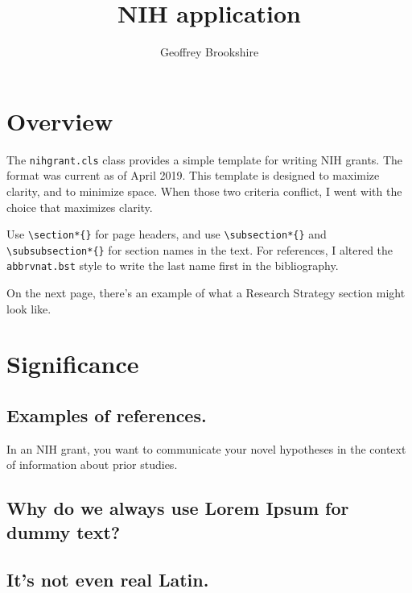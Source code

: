 \documentclass{nihgrant}
\title{NIH application}
\author{Geoffrey Brookshire}
\date{}
\begin{document}
\section*{Overview}

The \verb|nihgrant.cls| class provides a simple template for writing NIH grants. The format was current as of April 2019. This template is designed to maximize clarity, and to minimize space. When those two criteria conflict, I went with the choice that maximizes clarity.

Use \verb|\section*{}| for page headers, and use \verb|\subsection*{}| and \verb|\subsubsection*{}| for section names in the text. For references, I altered the \verb|abbrvnat.bst| style to write the last name first in the bibliography.

On the next page, there's an example of what a Research Strategy section might look like.

\pagebreak

\section*{Significance}

\subsection*{Examples of references.} In an NIH grant, you want to communicate your novel hypotheses \cite{kuhn1962} in the context of information \cite{shannon1948} about prior studies.

\subsection*{Why do we always use Lorem Ipsum for dummy text?}
\lipsum[1-1]

\subsection*{It's not even real Latin.} 
\lipsum[3-3]
\end{document}
